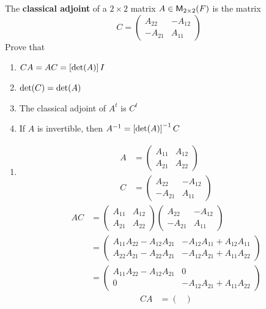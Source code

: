The {\bf classical adjoint} of a $2\times 2$ matrix $A \in
\mathsf{M}_{2 \times 2}(F)$ is the matrix
\begin{equation*}
C = \begin{pmatrix}
A_{22} & - A_{12}\\
-A_{21} & A_{11}
\end{pmatrix}
\end{equation*}
Prove that
\begin{enumerate}
\item $CA = AC = \left[\text{det}({A})\right]I$
\item $\text{det}({C}) = \text{det}({A})$
\item The classical adjoint of $A^t$ is $C^t$
\item If $A$ is invertible, then $A^{-1} = \left[\text{det}({A})\right]^{-1}C$
\end{enumerate}
\begin{enumerate}
\item 
\begin{align}
A & = \begin{pmatrix}A_{11}&A_{12}\\A_{21}&A_{22}\end{pmatrix}\\
C & = \begin{pmatrix}A_{22}&-A_{12}\\-A_{21}&A_{11}\end{pmatrix}
\end{align}
\begin{align}
AC
&= \begin{pmatrix}A_{11}&A_{12}\\A_{21}&A_{22}\end{pmatrix}\begin{pmatrix}A_{22}&-A_{12}\\-A_{21}&A_{11}\end{pmatrix}\\
&= \begin{pmatrix}
A_{11}A_{22} -A_{12}A_{21} &  -A_{12}A_{11} +A_{12}A_{11}\\ 
A_{22}A_{21}-A_{22}A_{21} & -A_{12}A_{21} + A_{11}A_{22}
\end{pmatrix}\\
&= \begin{pmatrix}
A_{11}A_{22} -A_{12}A_{21} &  0\\ 
0 & -A_{12}A_{21} + A_{11}A_{22}
\end{pmatrix}
\end{align}
\begin{align}
CA &= 
\begin{pmatrix}

\end{pmatrix}
\end{align}
\end{enumerate}
